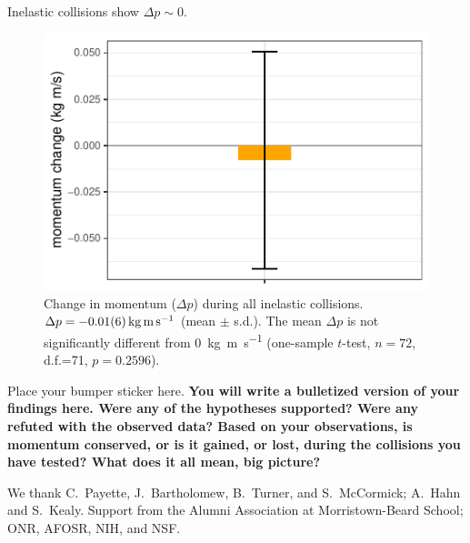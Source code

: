 \documentclass[pdf,serif]{beamer}
\begin{document}
\begin{frame}{}
\begin{columns}[T,totalwidth=\textwidth]
\begin{column}{14.33in}
\begin{minipage}[t][\textheight]{\linewidth}
\begin{block}{Inelastic collisions show $\Delta p\sim 0$.}
\begin{figure}
\begin{center}
\includegraphics[width=0.8\columnwidth]{momentum-change.pdf}
\end{center}
\caption{Change in momentum ($\Delta p$) during all inelastic collisions. $\Delta p = \SI{-0.01\pm0.06}{\kilo\gram\meter\per\second}$ (mean $\pm$ s.d.). The mean $\Delta p$ is not significantly different from \SI{0}{\kilo\gram\meter\per\second} (one-sample $t$-test, $n=72$, d.f.=71, $p=0.2596$).}
\label{fig:results2}
\end{figure}
\end{block}
\vfill
\begin{block}{Place your bumper sticker here.}
\textbf{You will write a bulletized version of your findings here.  Were any of the hypotheses supported? Were any refuted with the observed data? Based on your observations, is momentum conserved, or is it gained, or lost, during the collisions you have tested? What does it all mean, big picture?}
\end{block}
\vspace{1.25in}
\begin{block}{} %
We thank C.~Payette, J.~Bartholomew, B.~Turner, and S.~McCormick; A.~Hahn and S.~Kealy. Support from the Alumni Association at Morristown-Beard School; ONR, AFOSR, NIH, and NSF.
\end{block}
\vfill*
\end{minipage}
\end{column}
\end{columns}
\end{frame}
\end{document}
